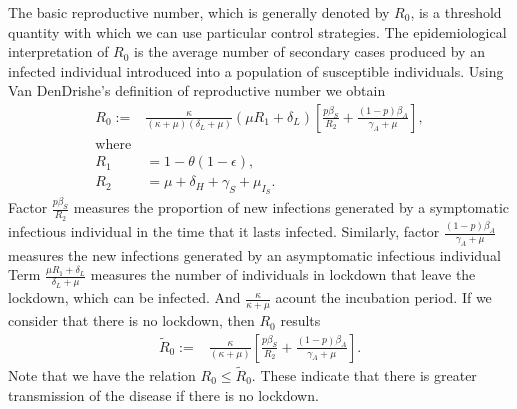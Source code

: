 %
The basic reproductive number, which is generally denoted by $ R_0 $,
is a threshold quantity with which we can use 
particular control strategies. The epidemiological interpretation of 
$ R_0 $ is the average number of secondary cases produced by an infected
individual introduced into a population of susceptible individuals.
Using Van DenDrishe's \cite{VandenDriessche2017a} definition of reproductive number
we obtain
\begin{equation*}
    \label{eqn:reproductive_number}
    \begin{aligned}
        R_0 :=
        &
        \frac{\kappa}{(\kappa + \mu)(\delta_L + \mu)}
        \left(
           \mu R_1 + \delta_L
        \right)
        \left[
            \frac{p\beta_S}{R_2}
            +\frac{(1 - p) \beta_A}{\gamma_A+\mu}
        \right],
    \\
    \text{where} &
    \\
        R_1 &= 1 - \theta(1 - \epsilon),
    \\
        R_2 &= \mu + \delta_H + \gamma_S + \mu_{I_{S}}.
    \end{aligned}
\end{equation*}
%
Factor $\frac{p\beta_S}{R_2}$ measures the proportion of new infections
generated by a symptomatic infectious individual in the time that it lasts
infected. Similarly, factor $\frac{(1 - p) \beta_A}{\gamma_A+\mu}$
measures the new infections generated by an asymptomatic infectious individual
Term  
$
    \frac{\mu R_1 + \delta_L}{\delta_L + \mu}
$ measures the number of individuals in lockdown that leave the 
lockdown, which can be infected.
And $\frac{\kappa}{\kappa + \mu}$ acount
the incubation period.
%
If we consider that there is no lockdown, then  $ R_0 $ results
\begin{equation*}
    \label{eqn:reproductive_number}
    \begin{aligned}
        \tilde{R}_0 :=
        &
        \frac{\kappa}{(\kappa + \mu)}
        \left[
            \frac{p\beta_S}{R_2}
            +\frac{(1 - p) \beta_A}{\gamma_A+\mu}
        \right].
    \end{aligned}
\end{equation*}
%
Note that we have the relation $ R_0 \leq \tilde{R}_0 $. These indicate that there is greater
 transmission of the disease if there is no lockdown.
%
